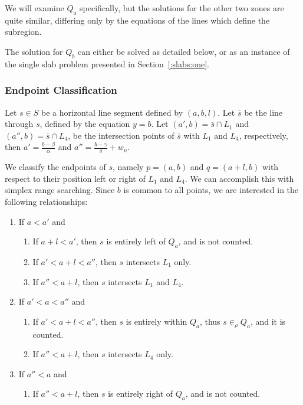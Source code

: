 We will examine $Q_a$ specifically, but the solutions for the other two zones are quite similar, differing only by the equations of the lines which define the subregion.

The solution for $Q_b$ can either be solved as detailed below, or as an instance of the single slab problem presented in Section~\ref{:slabs:one}.


\subsubsection{Endpoint Classification}

Let $s \in S$ be a horizontal line segment defined by $(a, b, l)$.  Let $\overline{s}$ be the line through $s$, defined by the equation $y = b$.  Let $(a', b) = \overline{s} \cap L_1$ and $(a'', b) = \overline{s} \cap L_4$, be the intersection points of $\overline{s}$ with $L_1$ and $L_4$, respectively, then $a' = \frac{b - \beta}{\alpha}$ and $a'' = \frac{b - \gamma}{\delta} + w_n$.

We classify the endpoints of $s$, namely $p = (a, b)$ and $q = (a + l, b)$ with respect to their position left or right of $L_1$ and $L_4$. We can accomplish this with simplex range searching. Since $b$ is common to all points, we are interested in the following relationships:

\begin{enumerate}
 \item If $a < a'$ and

 \begin{enumerate}
  \item If $a + l < a'$, then $s$ is entirely left of $Q_a$, and is not counted.
  \item If $a' < a + l < a''$, then $s$ intersects $L_1$ only.
  \item If $a'' < a + l$, then $s$ intersects $L_1$ and $L_4$.
 \end{enumerate}

 \item If $a' < a < a''$ and
 \begin{enumerate}
  \item If $a' < a + l < a''$, then $s$ is entirely within $Q_a$, thus $s \in_\rho Q_a$, and it is counted.
  \item If $a'' < a + l$, then $s$ intersects $L_4$ only.
 \end{enumerate}

 \item If $a'' < a$ and
 \begin{enumerate}
  \item If $a'' < a + l$, then $s$ is entirely right of $Q_a$, and is not counted.
 \end{enumerate}
\end{enumerate}

